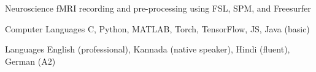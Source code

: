 


\begin{cvskills}

  \cvskill
    {Neuroscience} %
   {fMRI recording and pre-processing using FSL, SPM, and Freesurfer} %
    
  \cvskill
    {Computer Languages} %
    {C, Python, MATLAB, Torch, TensorFlow, JS, Java (basic)} %

  \cvskill
    {Languages} %
    {English (professional), Kannada (native speaker), Hindi (fluent), German (A2)} %

\end{cvskills}

